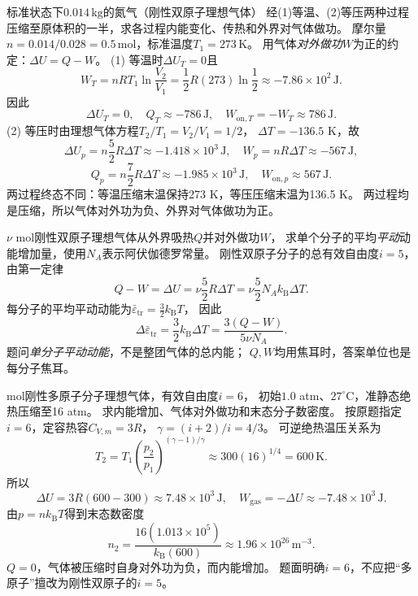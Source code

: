 
\problemtext 标准状态下$0.014\,\mathrm{kg}$的氮气（刚性双原子理想气体）
经(1)等温、(2)等压两种过程压缩至原体积的一半，求各过程内能变化、传热和外界对气体做功。
\workings
摩尔量$n=0.014/0.028=0.5\,\mathrm{mol}$，标准温度$T_1=273\,\mathrm K$。
用气体\emph{对外做功}$W$为正的约定：$\Delta U=Q-W$。
(1) 等温时$\Delta U_T=0$且
\[
W_T=nRT_1\ln\frac{V_2}{V_1}
=\frac12 R(273)\ln\frac12\approx-7.86\times10^2\,\mathrm J.
\]
因此
\[
\boxed{\Delta U_T=0},\quad
\boxed{Q_T\approx-786\,\mathrm J},\quad
\boxed{W_{\mathrm{on},T}=-W_T\approx786\,\mathrm J}.
\]
(2) 等压时由理想气体方程$T_2/T_1=V_2/V_1=1/2$，
$\Delta T=-136.5$ K，故
\[
\boxed{\Delta U_p=n\frac52 R\Delta T\approx-1.418\times10^3\,\mathrm J},
\quad
\boxed{W_p=nR\Delta T\approx-567\,\mathrm J},
\]
\[
\boxed{Q_p=n\frac72 R\Delta T\approx-1.985\times10^3\,\mathrm J},
\quad
\boxed{W_{\mathrm{on},p}\approx567\,\mathrm J}.
\]
\crosscheck 两过程终态不同：等温压缩末温保持273 K，等压压缩末温为136.5 K。
两过程均是压缩，所以气体对外功为负、外界对气体做功为正。

\problemtext $\nu$ mol刚性双原子理想气体从外界吸热$Q$并对外做功$W$，
求单个分子的平均\emph{平动}动能增加量，使用$N_A$表示阿伏伽德罗常量。
\workings
刚性双原子分子的总有效自由度$i=5$，由第一定律
\[
Q-W=\Delta U=\nu\frac52 R\Delta T
=\nu\frac52N_Ak_{\mathrm B}\Delta T.
\]
每分子的平均平动动能为$\bar\varepsilon_{\mathrm{tr}}=\frac32k_{\mathrm B}T$，
因此
\[
\boxed{\Delta\bar\varepsilon_{\mathrm{tr}}
=\frac32k_{\mathrm B}\Delta T
=\frac{3(Q-W)}{5\nu N_A}}.
\]
\crosscheck 题问\emph{单分子平动动能}，不是整团气体的总内能；
$Q,W$均用焦耳时，答案单位也是每分子焦耳。

 mol刚性多原子分子理想气体，有效自由度$i=6$，
初始$1.0$ atm、$27^\circ$C，准静态绝热压缩至16 atm。
求内能增加、气体对外做功和末态分子数密度。
\workings
按原题指定$i=6$，定容热容$C_{V,m}=3R$，
$\gamma=(i+2)/i=4/3$。
可逆绝热温压关系为
\[
T_2=T_1\left(\frac{p_2}{p_1}\right)^{(\gamma-1)/\gamma}
\approx 300(16)^{1/4}=600\,\mathrm K.
\]
所以
\[
\boxed{\Delta U=3R(600-300)\approx7.48\times10^3\,\mathrm J},
\quad
\boxed{W_{\mathrm{gas}}=-\Delta U\approx-7.48\times10^3\,\mathrm J}.
\]
由$p=nk_{\mathrm B}T$得到末态数密度
\[
\boxed{n_2=\frac{16(1.013\times10^5)}{k_{\mathrm B}(600)}
\approx1.96\times10^{26}\,\mathrm{m^{-3}}}.
\]
\crosscheck $Q=0$，气体被压缩时自身对外功为负，而内能增加。
题面明确$i=6$，不应把“多原子”擅改为刚性双原子的$i=5$。

